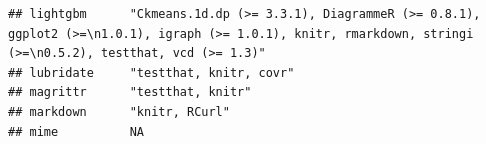 \documentclass[]{article}
\begin{document}
\begin{verbatim}
## lightgbm      "Ckmeans.1d.dp (>= 3.3.1), DiagrammeR (>= 0.8.1), ggplot2 (>=\n1.0.1), igraph (>= 1.0.1), knitr, rmarkdown, stringi (>=\n0.5.2), testthat, vcd (>= 1.3)"                                                                                                                                                                                                                                                                                                                                                                                                                                  
## lubridate     "testthat, knitr, covr"                                                                                                                                                                                                                                                                                                                                                                                                                                                                                                                                                                   
## magrittr      "testthat, knitr"                                                                                                                                                                                                                                                                                                                                                                                                                                                                                                                                                                         
## markdown      "knitr, RCurl"                                                                                                                                                                                                                                                                                                                                                                                                                                                                                                                                                                            
## mime          NA                                                                                                                                                                                                                                                                                                                                                                                                                                                                                                                                                                                        

\end{verbatim}
\end{document}
